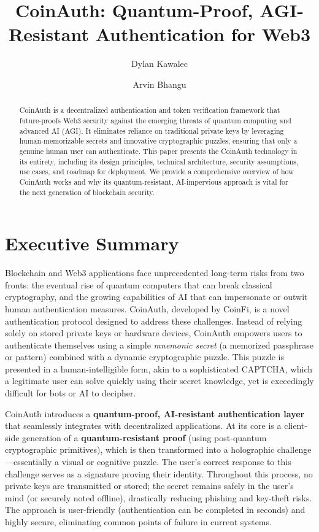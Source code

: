 \documentclass[10pt,letterpaper]{article}
\begin{document}
\title{CoinAuth: Quantum-Proof, AGI-Resistant Authentication for Web3}
\author{Dylan Kawalec \and Arvin Bhangu}
\date{}
\maketitle

\date{}
\maketitle

\begin{abstract}
CoinAuth is a decentralized authentication and token verification framework that future-proofs Web3 security against the emerging threats of quantum computing and advanced AI (AGI). It eliminates reliance on traditional private keys by leveraging human-memorizable secrets and innovative cryptographic puzzles, ensuring that only a genuine human user can authenticate. This paper presents the CoinAuth technology in its entirety, including its design principles, technical architecture, security assumptions, use cases, and roadmap for deployment. We provide a comprehensive overview of how CoinAuth works and why its quantum-resistant, AI-impervious approach is vital for the next generation of blockchain security.
\end{abstract}

\section{Executive Summary}

Blockchain and Web3 applications face unprecedented long-term risks from two fronts: the eventual rise of quantum computers that can break classical cryptography, and the growing capabilities of AI that can impersonate or outwit human authentication measures. CoinAuth, developed by CoinFi, is a novel authentication protocol designed to address these challenges. Instead of relying solely on stored private keys or hardware devices, CoinAuth empowers users to authenticate themselves using a simple \emph{mnemonic secret} (a memorized passphrase or pattern) combined with a dynamic cryptographic puzzle. This puzzle is presented in a human-intelligible form, akin to a sophisticated CAPTCHA, which a legitimate user can solve quickly using their secret knowledge, yet is exceedingly difficult for bots or AI to decipher.

CoinAuth introduces a \textbf{quantum-proof, AI-resistant authentication layer} that seamlessly integrates with decentralized applications. At its core is a client-side generation of a \textbf{quantum-resistant proof} (using post-quantum cryptographic primitives), which is then transformed into a holographic challenge—essentially a visual or cognitive puzzle. The user’s correct response to this challenge serves as a signature proving their identity. Throughout this process, no private keys are transmitted or stored; the secret remains safely in the user’s mind (or securely noted offline), drastically reducing phishing and key-theft risks. The approach is user-friendly (authentication can be completed in seconds) and highly secure, eliminating common points of failure in current systems.
\end{document}
